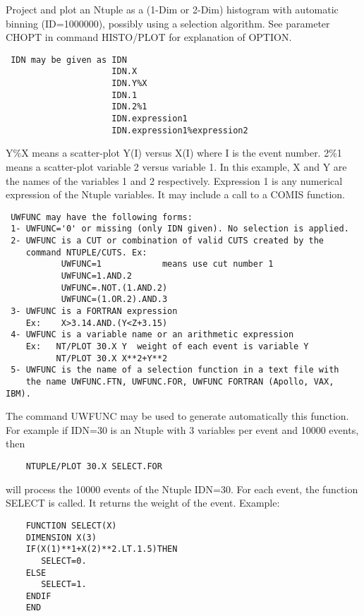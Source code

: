 \BEGARG
{}
\ENDARG
\BEGTEXT
Project and plot an Ntuple as a (1-Dim or 2-Dim) histogram
with automatic binning (ID=1000000),
possibly using a selection algorithm.
See parameter CHOPT in command HISTO/PLOT for explanation of OPTION.
\begin{verbatim}
 IDN may be given as IDN
                     IDN.X
                     IDN.Y%X
                     IDN.1
                     IDN.2%1
                     IDN.expression1
                     IDN.expression1%expression2
\end{verbatim}
Y\%X means a scatter-plot Y(I) versus X(I) where I is the event number.
2\%1 means a scatter-plot variable 2 versus variable 1.
In this example, X and Y are the names of the variables 1 and 2
respectively.
Expression 1 is any numerical expression of the Ntuple variables.
It may include a call to a COMIS function.
\begin{verbatim}
 UWFUNC may have the following forms:
 1- UWFUNC='0' or missing (only IDN given). No selection is applied.
 2- UWFUNC is a CUT or combination of valid CUTS created by the
    command NTUPLE/CUTS. Ex:
           UWFUNC=1            means use cut number 1
           UWFUNC=1.AND.2
           UWFUNC=.NOT.(1.AND.2)
           UWFUNC=(1.OR.2).AND.3
 3- UWFUNC is a FORTRAN expression
    Ex:    X>3.14.AND.(Y<Z+3.15)
 4- UWFUNC is a variable name or an arithmetic expression
    Ex:   NT/PLOT 30.X Y  weight of each event is variable Y
          NT/PLOT 30.X X**2+Y**2
 5- UWFUNC is the name of a selection function in a text file with
    the name UWFUNC.FTN, UWFUNC.FOR, UWFUNC FORTRAN (Apollo, VAX, IBM).
\end{verbatim}
The command UWFUNC may be used to generate automatically this function.
For example if IDN=30 is an Ntuple with 3 variables
per event and 10000 events, then
\begin{verbatim}
    NTUPLE/PLOT 30.X SELECT.FOR
\end{verbatim}
will process the 10000 events of the Ntuple IDN=30. For each event,
the function SELECT is called. It returns the weight of the event.
Example:
\begin{verbatim}
    FUNCTION SELECT(X)
    DIMENSION X(3)
    IF(X(1)**1+X(2)**2.LT.1.5)THEN
       SELECT=0.
    ELSE
       SELECT=1.
    ENDIF
    END
\end{verbatim}
